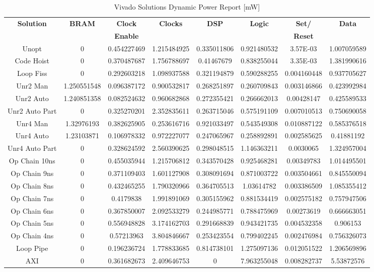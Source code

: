 \begin{table}[H]
	\centering
	\begin{tabular}{|c|c|c|c|c|c|c|c|}
		\hline
		\textbf{Solution} & \textbf{BRAM} & \textbf{Clock} & \textbf{Clocks} & \textbf{DSP} & \textbf{Logic} & \textbf{Set/}& \textbf{Data} \\
		& & \textbf{Enable} & & & & \textbf{Reset} & \\
		\hline
		Unopt & 0 & 0.454227469 & 1.215484925 & 0.335011806 & 0.921480532 & 3.57E-03 & 1.007059589 \\
		Code Hoist & 0 & 0.370487687 & 1.756788697 & 0.41467679 & 0.838255044 & 3.35E-03 & 1.381990616 \\
		Loop Fiss & 0 & 0.292603218 & 1.098937588 & 0.321194879 & 0.590288255 & 0.004160448 & 0.937705627 \\
		Unr2 Man & 1.250551548 & 0.096387172 & 0.900532817 & 0.268251897 & 0.260709843 & 0.003146866 & 0.423992984 \\
		Unr2 Auto & 1.240851358 & 0.082524632 & 0.960682868 & 0.272355421 & 0.266662013 & 0.00428147 & 0.425589533 \\
		Unr2 Auto Part & 0 & 0.325270201 & 2.352835611 & 0.263715046 & 0.575191109 & 0.007010513 & 0.750690058 \\
		Unr4 Man & 1.32976193 & 0.382625905 & 0.253616716 & 0.921033497 & 0.543549308 & 0.010887122 & 0.585376518 \\
		Unr4 Auto & 1.23103871 & 0.106978332 & 0.972227077 & 0.247065967 & 0.258892891 & 0.002585625 & 0.41881192 \\
		Unr4 Auto Part & 0 & 0.328624592 & 2.560390625 & 0.298048515 & 1.146363211 & 0.0030065 & 1.324957004 \\
		Op Chain 10ns & 0 & 0.455035944 & 1.215706812 & 0.343570428 & 0.925468281 & 0.00349783 & 1.014495501 \\
		Op Chain 9ns & 0 & 0.371109403 & 1.601127908 & 0.308091694 & 0.871003722 & 0.003504661 & 0.845550094 \\
		Op Chain 8ns & 0 & 0.432465255 & 1.790320966 & 0.364705513 & 1.03614782 & 0.003386509 & 1.085355412 \\
		Op Chain 7ns & 0 & 0.4179838 & 1.991891069 & 0.305155962 & 0.881534419 & 0.002575182 & 0.757947506 \\
		Op Chain 6ns & 0 & 0.367850007 & 2.092533279 & 0.244985771 & 0.788475969 & 0.00273619 & 0.666663051 \\
		Op Chain 5ns & 0 & 0.556948828 & 3.174162703 & 0.291668839 & 0.943421735 & 0.004532358 & 0.906153 \\
		Op Chain 4ns & 0 & 0.57213963 & 3.804846667 & 0.253423554 & 0.799402245 & 0.002476984 & 0.756326073 \\
		Loop Pipe & 0 & 0.196236724 & 1.778833685 & 0.814738101 & 1.275097136 & 0.012051522 & 1.206569896 \\
		AXI & 0 & 0.361682673 &	2.409646753 & 0 & 7.963255048 &	0.008282737 & 5.53872576 \\
		\hline
	\end{tabular}
	\caption{Vivado Solutions Dynamic Power Report [mW]}
	\label{tab:vivado-solutions-dynamic-power-report}
\end{table}

